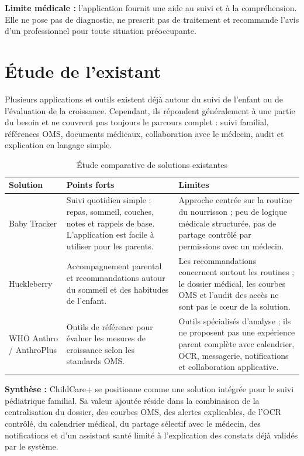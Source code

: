 \textbf{Limite médicale :} l'application fournit une aide au suivi et à la compréhension. Elle ne pose pas de diagnostic, ne prescrit pas de traitement et recommande l'avis d'un professionnel pour toute situation préoccupante.

\section{Étude de l'existant}
\label{sec:etude-existant}

Plusieurs applications et outils existent déjà autour du suivi de l'enfant ou de
l'évaluation de la croissance. Cependant, ils répondent généralement à une partie
du besoin et ne couvrent pas toujours le parcours complet : suivi familial,
références OMS, documents médicaux, collaboration avec le médecin, audit et
explication en langage simple.

\begin{table}[htbp]
\centering
\caption{Étude comparative de solutions existantes}
\label{tab:etude-existant}
\begin{tabularx}{\textwidth}{|l|X|X|}
\hline
\textbf{Solution} & \textbf{Points forts} & \textbf{Limites} \\
\hline
Baby Tracker & Suivi quotidien simple : repas, sommeil, couches, notes et rappels de base. L'application est facile à utiliser pour les parents. & Approche centrée sur la routine du nourrisson ; peu de logique médicale structurée, pas de partage contrôlé par permissions avec un médecin. \\
\hline
Huckleberry & Accompagnement parental et recommandations autour du sommeil et des habitudes de l'enfant. & Les recommandations concernent surtout les routines ; le dossier médical, les courbes OMS et l'audit des accès ne sont pas le cœur de la solution. \\
\hline
WHO Anthro / AnthroPlus & Outils de référence pour évaluer les mesures de croissance selon les standards OMS. & Outils spécialisés d'analyse ; ils ne proposent pas une expérience parent complète avec calendrier, OCR, messagerie, notifications et collaboration applicative. \\
\hline
\end{tabularx}
\end{table}

\textbf{Synthèse :} ChildCare+ se positionne comme une solution intégrée pour
le suivi pédiatrique familial. Sa valeur ajoutée réside dans la combinaison de la
centralisation du dossier, des courbes OMS, des alertes explicables, de l'OCR
contrôlé, du calendrier médical, du partage sélectif avec le médecin, des
notifications et d'un assistant santé limité à l'explication des constats déjà
validés par le système.

